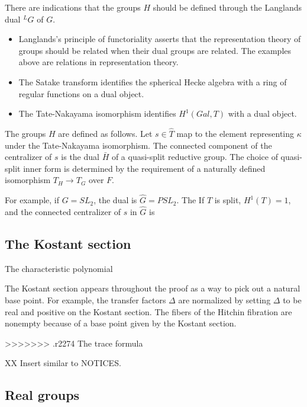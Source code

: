 \documentclass[brochure,english,12pt]{bourbaki}
\begin{document}
There are indications that the groups $H$ should be defined through  
the Langlands dual ${}^LG$ of $G$.
\begin{itemize}
\item Langlands's principle of functoriality asserts that the representation
theory of groups should be related when their dual groups are related.  The examples above are relations in representation theory.
\item The Satake transform identifies the spherical Hecke algebra with a ring of regular functions on a dual object.
\item The Tate-Nakayama isomorphism identifies $H^1(Gal,T)$
with a dual object.
\end{itemize}

The groups $H$ are defined as follows.  Let $s\in \hat T$ map
to the element representing $\kappa$ under the Tate-Nakayama isomorphism.
The connected component of the centralizer of $s$ is the dual $\bar H$
of a quasi-split reductive group.  The choice of
quasi-split inner form is determined by the requirement of a naturally
defined isomorphism $T_H\to T_G$ over $F$.

For example, if $G=SL_2$, the dual is $\hat G = PSL_2$.  The
If $T$ is split, $H^1(T)=1$, and the connected centralizer of $s$ in $\hat G$ is 

\subsection{The Kostant section}

The characteristic polynomial

The Kostant section appears throughout the proof as a way to pick
out a natural base point.  For example, the transfer factors $\Delta$
are normalized by setting $\Delta$ to be real and positive on the
Kostant section.  The fibers of the Hitchin fibration are nonempty
because of a base point given by the Kostant section. 

>>>>>>> .r2274
The trace formula

XX Insert similar to NOTICES.

\subsection{Real groups}
\end{document}
